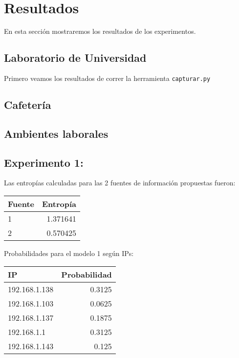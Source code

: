 \section{Resultados}
En esta sección mostraremos los resultados de los experimentos.

\subsection{Laboratorio de Universidad}

Primero veamos los resultados de correr la herramienta \texttt{capturar.py} 

\subsection{Cafetería}

\subsection{Ambientes laborales}

\subsection{Experimento 1:}

Las entropías calculadas para las 2 fuentes de información propuestas fueron:

\begin{center}
\begin{tabular}{ l r }
   Fuente& Entropía  \\
\hline
   1 & 1.371641 \\
   2 & 0.570425 \\
 \end{tabular}
\label{entropiashogar}
\end{center}

Probabilidades para el modelo 1 según IPs:

\begin{center}
\begin{tabular}{ l r }
   IP &Probabilidad \\
\hline
192.168.1.138	& 0.3125 \\
192.168.1.103	& 0.0625 \\
192.168.1.137	& 0.1875 \\
192.168.1.1		& 0.3125 \\
192.168.1.143	& 0.125 \\
 \end{tabular}
\label{probabilidadesModel1}
\end{center}

